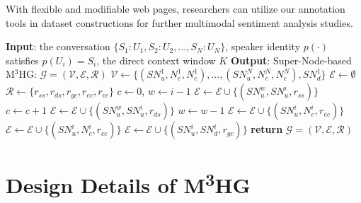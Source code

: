 \documentclass[11pt]{article}
\begin{document}
With flexible and modifiable web pages, researchers can utilize our annotation tools in dataset constructions for further multimodal sentiment analysis studies.
\begin{algorithm}
\caption{Super-Node-based Graph Constructuon for a Conversation}
\footnotesize
\begin{algorithmic}[1]
\State \textbf{Input}: the conversation $\{S_1:U_1, S_2:U_2, ..., S_N:U_N\}$, speaker identity $p(\cdot)$ satisfies $p(U_i) = S_i$, the direct context window $K$
\State \textbf{Output}: Super-Node-based M$^3$HG: $\mathcal{G} = (\mathcal{V}, \mathcal{E}, \mathcal{R})$
\State $\mathcal{V} \gets \{(SN_u^1, N_e^1, N_c^1), ..., (SN_u^N, N_e^N, N_c^N), SN_d^1\}$
\State $\mathcal{E} \gets \emptyset$
\State $\mathcal{R} \gets \{r_{ss}, r_{ds}, r_{gc}, r_{ec}, r_{cc}\}$
    \State $c \gets 0$, $w \gets i - 1$
            \State $\mathcal{E} \gets \mathcal{E} \cup \{(SN_u^w, SN_u^i, r_{ss})\}$ 
            \State $c \gets c + 1$
        \Else
            \State $\mathcal{E} \gets \mathcal{E} \cup \{(SN_u^w, SN_u^i, r_{ds})\}$ 
        \EndIf
        \State $w \gets w - 1$
    \EndWhile
\EndFor
{}
    \State $\mathcal{E} \gets \mathcal{E} \cup \{(SN_u^i, N_e^i, r_{ec})\}$ 
    \State $\mathcal{E} \gets \mathcal{E} \cup \{(SN_u^i, N_c^i, r_{cc})\}$ 
    \State $\mathcal{E} \gets \mathcal{E} \cup \{(SN_u^i, SN_d^i, r_{gc})\}$ 
\EndFor
\State \textbf{return} $\mathcal{G} = (\mathcal{V}, \mathcal{E}, \mathcal{R})$
\end{algorithmic}
\end{algorithm}
\section{\texorpdfstring{Design Details of M\textsuperscript{3}HG}{Design Details of M3HG}}
\end{document}
